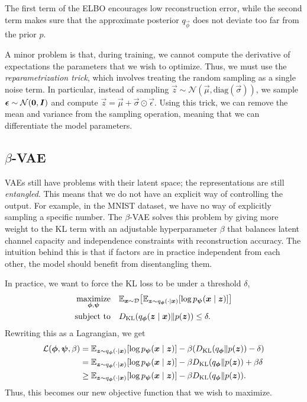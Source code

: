 The first term of the ELBO encourages low reconstruction error, while the second term makes sure that
the approximate posterior $q_{\vec{\phi}}$ does not deviate too far from the prior $p$.

A minor problem is that, during training, we cannot compute the derivative of expectations \wrt the
parameters that we wish to optimize. Thus, we must use the \textit{reparametrization trick}, which
involves treating the random sampling as a single noise term. In particular, instead of sampling
$\vec{z} \sim \mathcal{N}(\vec{\mu}, \mathrm{diag}(\vec{\sigma}))$, we sample $\bm{\epsilon} \sim
    \mathcal{N}(\bm{0},\bm{I})$ and compute $\vec{z} = \vec{\mu} + \vec{\sigma} \odot
    \vec{\epsilon}$. Using this trick, we can remove the mean and variance from the sampling operation,
meaning that we can differentiate \wrt the model parameters.

\subsection{$\beta$-VAE}

VAEs still have problems with their latent space; the representations are still \textit{entangled}.
This means that we do not have an explicit way of controlling the output. For example, in the MNIST
dataset, we have no way of explicitly sampling a specific number. The $\beta$-VAE solves this
problem by giving more weight to the KL term with an adjustable hyperparameter $\beta$ that
balances latent channel capacity and independence constraints with reconstruction accuracy. The
intuition behind this is that if factors are in practice independent from each other, the model
should benefit from disentangling them.

In practice, we want to force the KL loss to be under a threshold $\delta$,
\begin{align*}
    \underset{\vec{\phi},\vec{\psi}}{\text{maximize}} & \quad \E_{\vec{x} \sim \mathcal{D}} \lft[ \E_{\vec{z} \sim q_{\vec{\phi}}(\cdot \mid \vec{x})} \lft[ \log p_{\vec{\psi}}(\vec{x} \mid \vec{z}) \rgt] \rgt] \\
    \text{subject to}                                 & \quad D_{\mathrm{KL}} \lft( q_{\vec{\phi}}(\vec{z} \mid \vec{x}) \lVert p(\vec{z}) \rgt) \leq \delta.
\end{align*}
Rewriting this as a Lagrangian, we get
\begin{align*}
    \mathcal{L}(\bm{\phi},\bm{\psi},\beta) & = \mathbb{E}_{\bm{z} \sim q_{\bm{\phi}}(\cdot \mid \bm{x})} [\log p_{\bm{\psi}}(\bm{x} \mid \bm{z})] - \beta(D_{\mathrm{KL}}(q_{\bm{\phi}} \lVert p(\bm{z})) - \delta)      \\
                                             & = \mathbb{E}_{\bm{z} \sim q_{\bm{\phi}}(\cdot \mid \bm{x})} [\log p_{\bm{\psi}}(\bm{x} \mid \bm{z})] - \beta D_{\mathrm{KL}}(q_{\bm{\phi}} \lVert p(\bm{z})) + \beta \delta \\
                                             & \geq \mathbb{E}_{\bm{z} \sim q_{\bm{\phi}}(\cdot \mid \bm{x})} [\log p_{\bm{\psi}}(\bm{x} \mid \bm{z})] - \beta D_{\mathrm{KL}}(q_{\bm{\phi}} \lVert p(\bm{z})).
\end{align*}
Thus, this becomes our new objective function that we wish to maximize.
